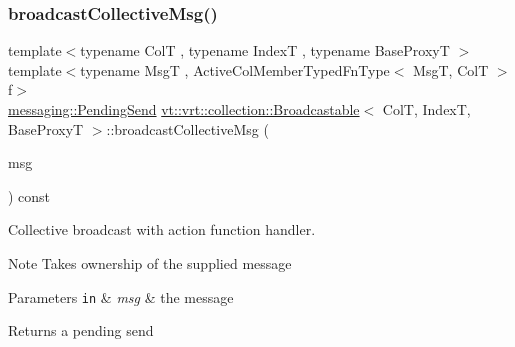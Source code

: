 \subsubsection{\texorpdfstring{broadcast\+Collective\+Msg()}{broadcastCollectiveMsg()}\hspace{0.1cm}{\footnotesize\ttfamily [1/2]}}
{\footnotesize\ttfamily template$<$typename ColT , typename IndexT , typename Base\+ProxyT $>$ \\
template$<$typename MsgT , Active\+Col\+Member\+Typed\+Fn\+Type$<$ Msg\+T, Col\+T $>$ f$>$ \\
\hyperlink{structvt_1_1messaging_1_1_pending_send}{messaging\+::\+Pending\+Send} \hyperlink{structvt_1_1vrt_1_1collection_1_1_broadcastable}{vt\+::vrt\+::collection\+::\+Broadcastable}$<$ ColT, IndexT, Base\+ProxyT $>$\+::broadcast\+Collective\+Msg (\begin{DoxyParamCaption}\item[{\hyperlink{structvt_1_1messaging_1_1_msg_ptr_thief}{messaging\+::\+Msg\+Ptr\+Thief}$<$ MsgT $>$}]{msg }\end{DoxyParamCaption}) const}



Collective broadcast with action function handler. 

\begin{DoxyNote}{Note}
Takes ownership of the supplied message
\end{DoxyNote}

\begin{DoxyParams}[1]{Parameters}
\mbox{\tt in}  & {\em msg} & the message\\
\hline
\end{DoxyParams}
\begin{DoxyReturn}{Returns}
a pending send 
\end{DoxyReturn}
\mbox{\label{structvt_1_1vrt_1_1collection_1_1_broadcastable_a70ec0f06ef5566c713a4d960a8faa39b}} 
